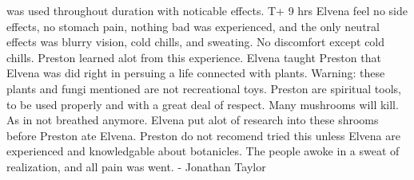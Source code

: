\documentclass[12pt]{book}
\begin{document}
was used throughout duration with noticable effects. T+ 9 hrs Elvena feel no side effects, no stomach pain, nothing bad was experienced, and the only neutral effects was blurry vision, cold chills, and sweating. No discomfort except cold chills. Preston learned alot from this experience. Elvena taught Preston that Elvena was did right in persuing a life connected with plants. Warning: these plants and fungi mentioned are not recreational toys. Preston are spiritual tools, to be used properly and with a great deal of respect. Many mushrooms will kill. As in not breathed anymore. Elvena put alot of research into these shrooms before Preston ate Elvena. Preston do not recomend tried this unless Elvena are experienced and knowledgable about botanicles. The people awoke in a sweat of realization, and all pain was went. - Jonathan Taylor
\end{document}
